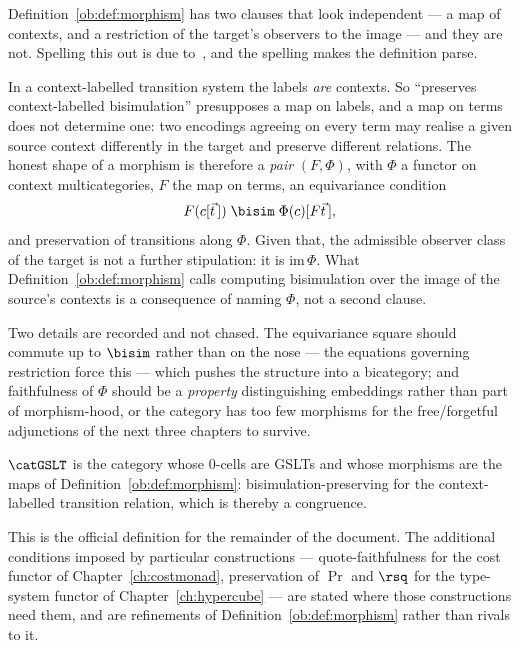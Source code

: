 \begin{remark}
\label{ob:rem:pair}
Definition~\ref{ob:def:morphism} has two clauses that look independent --- a map
of contexts, and a restriction of the target's observers to the image --- and
they are not. Spelling this out is due to~\cite{BIHOL}, and the spelling makes
the definition parse.

In a context-labelled transition system the labels \emph{are} contexts. So
``preserves context-labelled bisimulation'' presupposes a map on labels, and a map
on terms does not determine one: two encodings agreeing on every term may realise
a given source context differently in the target and preserve different relations.
The honest shape of a morphism is therefore a \emph{pair} $(F,\Phi)$, with $\Phi$
a functor on context multicategories, $F$ the map on terms, an equivariance
condition
\[
  F(c[\vec t\,]) \;\bisim\; \Phi(c)[F\vec t\,] ,
\]
and preservation of transitions along $\Phi$. Given that, the admissible observer
class of the target is not a further stipulation: it is $\mathrm{im}\,\Phi$. What
Definition~\ref{ob:def:morphism} calls computing bisimulation over the image of
the source's contexts is a consequence of naming $\Phi$, not a second clause.

Two details are recorded and not chased. The equivariance square should commute up
to $\bisim$ rather than on the nose --- the equations governing restriction force
this --- which pushes the structure into a bicategory; and faithfulness of $\Phi$
should be a \emph{property} distinguishing embeddings rather than part of
morphism-hood, or the category has too few morphisms for the free/forgetful
adjunctions of the next three chapters to survive.
\end{remark}

\begin{definition}
\label{ob:def:GSLTcat}
$\catGSLT$ is the category whose $0$-cells are GSLTs and whose morphisms are the maps of
Definition~\ref{ob:def:morphism}: bisimulation-preserving for the context-labelled
transition relation, which is thereby a congruence.
\end{definition}

This is the official definition for the remainder of the document. The additional
conditions imposed by particular constructions --- quote-faithfulness for the cost
functor of Chapter~\ref{ch:costmonad}, preservation of $\Pr$ and $\rsq$ for the type-system
functor of Chapter~\ref{ch:hypercube} --- are stated where those constructions need
them, and are refinements of Definition~\ref{ob:def:morphism} rather than rivals to it.

